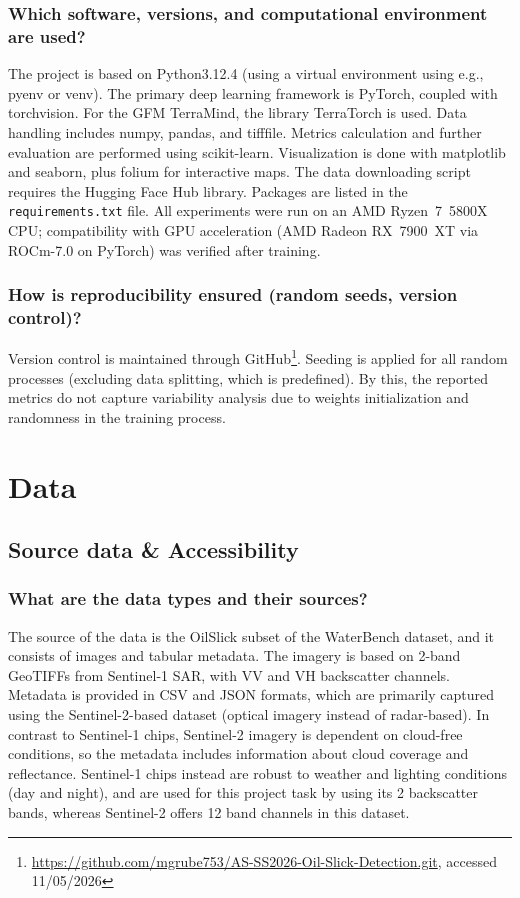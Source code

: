 \documentclass[sigconf]{acmart}
\begin{document}
\subsubsection{Which software, versions, and computational environment are used?} The project is based on Python3.12.4 (using a virtual environment using e.g., pyenv or venv). The primary deep learning framework is PyTorch, coupled with torchvision. For the GFM TerraMind, the library TerraTorch is used. Data handling includes numpy, pandas, and tifffile. Metrics calculation and further evaluation are performed using scikit-learn. Visualization is done with matplotlib and seaborn, plus folium for interactive maps. The data downloading script requires the Hugging Face Hub library. Packages are listed in the \texttt{requirements.txt} file. All experiments were run on an AMD Ryzen~7~5800X CPU; compatibility with GPU acceleration (AMD Radeon RX~7900~XT via ROCm-7.0 on PyTorch) was verified after training.
\subsubsection{How is reproducibility ensured (random seeds, version control)?}
Version control is maintained through GitHub\footnote{\url{https://github.com/mgrube753/AS-SS2026-Oil-Slick-Detection.git}, accessed 11/05/2026}. Seeding is applied for all random processes (excluding data splitting, which is predefined). By this, the reported metrics do not capture variability analysis due to weights initialization and randomness in the training process.

\section{Data} \label{sec:data}

\subsection{Source data \& Accessibility}
\subsubsection{What are the data types and their sources?} The source of the data is the OilSlick subset of the WaterBench dataset, and it consists of images and tabular metadata. The imagery is based on 2-band GeoTIFFs from Sentinel-1 SAR, with VV and VH backscatter channels. Metadata is provided in CSV and JSON formats, which are primarily captured using the Sentinel-2-based dataset (optical imagery instead of radar-based). In contrast to Sentinel-1 chips, Sentinel-2 imagery is dependent on cloud-free conditions, so the metadata includes information about cloud coverage and reflectance. Sentinel-1 chips instead are robust to weather and lighting conditions (day and night), and are used for this project task by using its 2 backscatter bands, whereas Sentinel-2 offers 12 band channels in this dataset.
\end{document}
